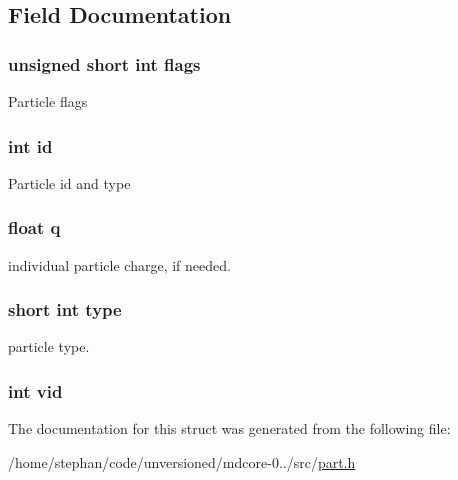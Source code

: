 \subsection{Field Documentation}
\hypertarget{structpart_ae718cba7f740adbac78a900ce25b73af}{
\subsubsection[{flags}]{\setlength{\rightskip}{0pt plus 5cm}unsigned short int flags}}\label{structpart_ae718cba7f740adbac78a900ce25b73af}
Particle flags \hypertarget{structpart_a7441ef0865bcb3db9b8064dd7375c1ea}{
\subsubsection[{id}]{\setlength{\rightskip}{0pt plus 5cm}int id}}\label{structpart_a7441ef0865bcb3db9b8064dd7375c1ea}
Particle id and type \hypertarget{structpart_a0a19a0620af7373e3ddba0ce4e1058e1}{
\subsubsection[{q}]{\setlength{\rightskip}{0pt plus 5cm}float q}}\label{structpart_a0a19a0620af7373e3ddba0ce4e1058e1}
individual particle charge, if needed. \hypertarget{structpart_aaa8ba4297d83f2cce5af75b18564ae13}{
\subsubsection[{type}]{\setlength{\rightskip}{0pt plus 5cm}short int type}}\label{structpart_aaa8ba4297d83f2cce5af75b18564ae13}
particle type. \hypertarget{structpart_af1cae64e47ec410dab67cb572e4acd36}{
\subsubsection[{vid}]{\setlength{\rightskip}{0pt plus 5cm}int vid}}\label{structpart_af1cae64e47ec410dab67cb572e4acd36}


The documentation for this struct was generated from the following file\-:\begin{DoxyCompactItemize}
\item 
/home/stephan/code/unversioned/mdcore-\/0../src/\hyperlink{part_8h}{part.\-h}\end{DoxyCompactItemize}
